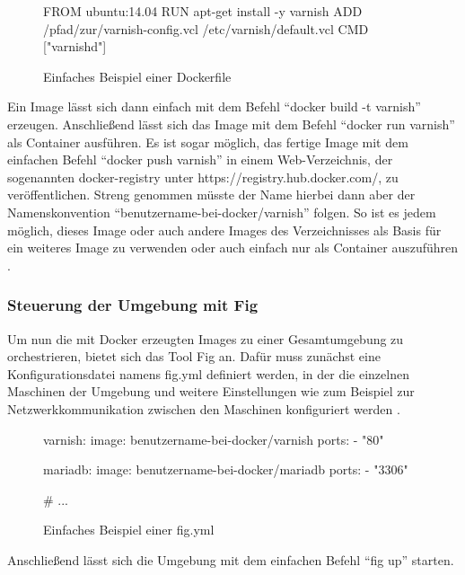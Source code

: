\begin{figure}[!ht]
  \begin{center}
    \begin{dockercode}
FROM ubuntu:14.04
RUN apt-get install -y varnish
ADD /pfad/zur/varnish-config.vcl /etc/varnish/default.vcl
CMD ["varnishd"]
    \end{dockercode}
    \caption{Einfaches Beispiel einer Dockerfile}
  \end{center}
\end{figure}

Ein Image lässt sich dann einfach mit dem Befehl "`docker build -t varnish"' erzeugen. Anschließend lässt sich das Image mit dem Befehl "`docker run varnish"' als Container ausführen. Es ist sogar möglich, das fertige Image mit dem einfachen Befehl "`docker push varnish"' in einem Web-Verzeichnis, der sogenannten docker-registry unter https://registry.hub.docker.com/, zu veröffentlichen. Streng genommen müsste der Name hierbei dann aber der Namenskonvention "`benutzername-bei-docker/varnish"' folgen. So ist es jedem möglich, dieses Image oder auch andere Images des Verzeichnisses als Basis für ein weiteres Image zu verwenden oder auch einfach nur als Container auszuführen \citep[Vgl][]{docker:004}.

\subsubsection{Steuerung der Umgebung mit Fig}

Um nun die mit Docker erzeugten Images zu einer Gesamtumgebung zu orchestrieren, bietet sich das Tool Fig an. Dafür muss zunächst eine Konfigurationsdatei namens fig.yml definiert werden, in der die einzelnen Maschinen der Umgebung und weitere Einstellungen wie zum Beispiel zur Netzwerkkommunikation zwischen den Maschinen konfiguriert werden \citep[Vgl.][]{docker:006}.

\begin{figure}[!ht]
  \begin{center}
    \begin{yamlcode}
varnish:
  image: benutzername-bei-docker/varnish
  ports:
   - "80"

mariadb:
  image: benutzername-bei-docker/mariadb
  ports:
   - "3306"

# ...
    \end{yamlcode}
    \caption{Einfaches Beispiel einer fig.yml}
  \end{center}
\end{figure}

Anschließend lässt sich die Umgebung mit dem einfachen Befehl "`fig up"' starten.
